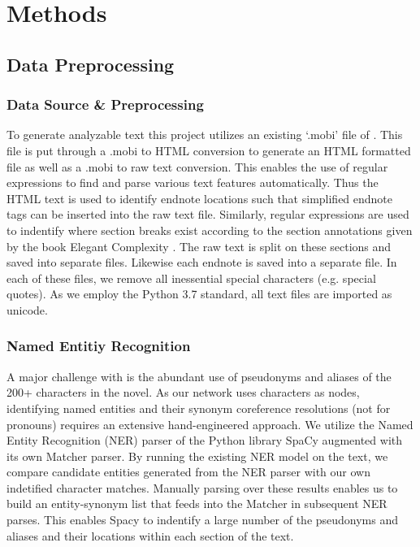 \section{Methods}

\subsection{Data Preprocessing}
\subsubsection{Data Source \& Preprocessing}
To generate analyzable text this project utilizes an existing `.mobi' file of \infinitejest. This file is put through a .mobi to HTML conversion to generate an HTML formatted file as well as a .mobi to raw text conversion. This enables the use of regular expressions to find and parse various text features automatically. Thus the HTML text is used to identify endnote locations such that simplified endnote tags can be inserted into the raw text file. Similarly, regular expressions are used to indentify where section breaks exist according to the section annotations given by the book Elegant Complexity \cite{carlisle_2007}. The raw text is split on these sections and saved into separate files. Likewise each endnote is saved into a separate file. In each of these files, we remove all inessential special characters (e.g. special quotes). As we employ the Python 3.7 standard, all text files are imported as unicode.

\subsubsection{Named Entitiy Recognition}

A major challenge with \infinitejest is the abundant use of pseudonyms and aliases of the 200+ characters in the novel. As our network uses characters as nodes, identifying named entities and their synonym coreference resolutions (not for pronouns) requires an extensive hand-engineered approach. We utilize the Named Entity Recognition (NER) parser of the Python library SpaCy \cite{spacy2} augmented with its own Matcher parser. By running the existing NER model on the text, we compare candidate entities generated from the NER parser with our own indetified character matches. Manually parsing over these results enables us to build an entity-synonym list that feeds into the Matcher in subsequent NER parses. This enables Spacy to indentify a large number of the pseudonyms and aliases and their locations within each section of the text.

